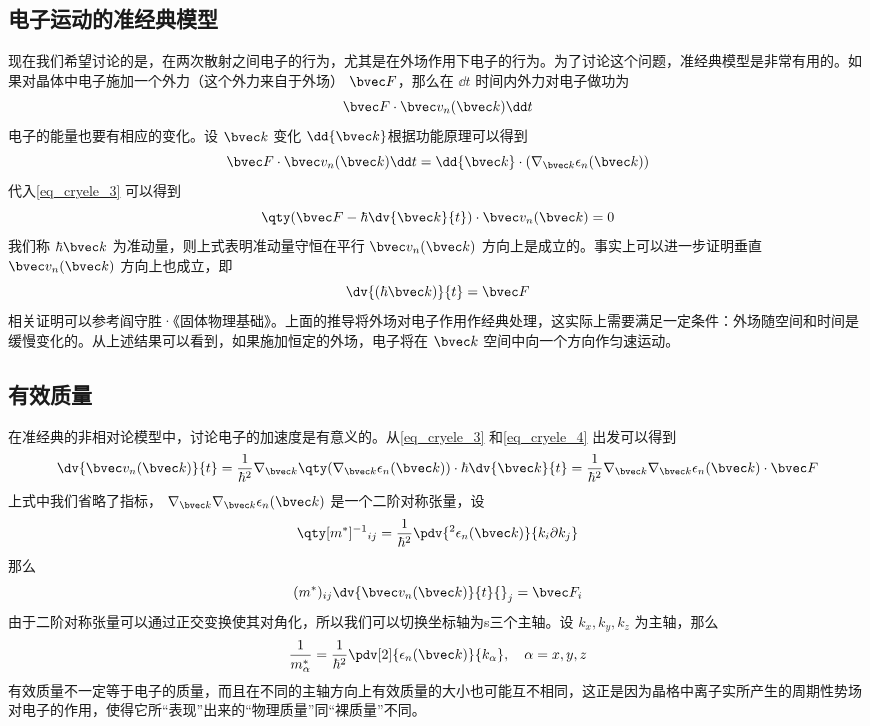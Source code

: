 \subsection{电子运动的准经典模型}
现在我们希望讨论的是，在两次散射之间电子的行为，尤其是在外场作用下电子的行为。为了讨论这个问题，准经典模型是非常有用的。如果对晶体中电子施加一个外力（这个外力来自于外场） $\bvec F$，那么在 $\dd t$ 时间内外力对电子做功为
\begin{equation}
\bvec F\cdot \bvec v_n(\bvec k)\dd t
\end{equation}
电子的能量也要有相应的变化。设 $\bvec k$ 变化 $\dd{\bvec k}$根据功能原理可以得到
\begin{equation}
\bvec F\cdot \bvec v_n(\bvec k)\dd t
=\dd {\bvec k}\cdot (\nabla_{\bvec k}\epsilon_n(\bvec k))
\end{equation}
代入\autoref{eq_cryele_3} 可以得到
\begin{equation}
\qty(\bvec F-\hbar\dv{\bvec k}{t})\cdot \bvec v_n(\bvec k)=0
\end{equation}
我们称 $\hbar \bvec k$ 为准动量，则上式表明准动量守恒在平行 $\bvec v_n(\bvec k)$ 方向上是成立的。事实上可以进一步证明垂直 $\bvec v_n(\bvec k)$ 方向上也成立，即
\begin{equation}\label{eq_cryele_4}
\dv{(\hbar \bvec k)}{t}=\bvec F
\end{equation}
相关证明可以参考阎守胜·《固体物理基础》\cite{阎守胜}。上面的推导将外场对电子作用作经典处理，这实际上需要满足一定条件：外场随空间和时间是缓慢变化的。从上述结果可以看到，如果施加恒定的外场，电子将在 $\bvec k$ 空间中向一个方向作匀速运动。
\subsection{有效质量}
在准经典的非相对论模型中，讨论电子的加速度是有意义的。从\autoref{eq_cryele_3} 和\autoref{eq_cryele_4} 出发可以得到
\begin{equation}
\dv{\bvec v_n(\bvec k)}{t}=\frac{1}{\hbar^2}\nabla_{\bvec k}\qty(\nabla_{\bvec k}\epsilon_n(\bvec k) )\cdot \hbar\dv{\bvec k}{t}=\frac{1}{\hbar^2}\nabla_{\bvec k}\nabla_{\bvec k}\epsilon_n(\bvec k) \cdot \bvec F
\end{equation}
上式中我们省略了指标， $\nabla_{\bvec k}\nabla_{\bvec k}\epsilon_n(\bvec k)$ 是一个二阶对称张量，设
\begin{equation}
\qty[m^{*}]^{-1}{}_{ij}=\frac{1}{\hbar^2}\pdv{{}^2\epsilon_n(\bvec k)}{k_i\partial k_j} 
\end{equation}
那么
\begin{equation}
(m^*)_{ij}\dv{\bvec v_n(\bvec k)}{t}{}_j=\bvec F_i
\end{equation}
由于二阶对称张量可以通过正交变换使其对角化，所以我们可以切换坐标轴为s三个主轴。设 $k_x,k_y,k_z$ 为主轴，那么
\begin{equation}\label{eq_cryele_5}
\frac{1}{m_\alpha^*}=\frac{1}{\hbar^2}\pdv[2]{\epsilon_n(\bvec k)}{k_\alpha},\quad \alpha=x,y,z
\end{equation}
有效质量不一定等于电子的质量，而且在不同的主轴方向上有效质量的大小也可能互不相同，这正是因为晶格中离子实所产生的周期性势场对电子的作用，使得它所“表现”出来的“物理质量”同“裸质量”不同。

